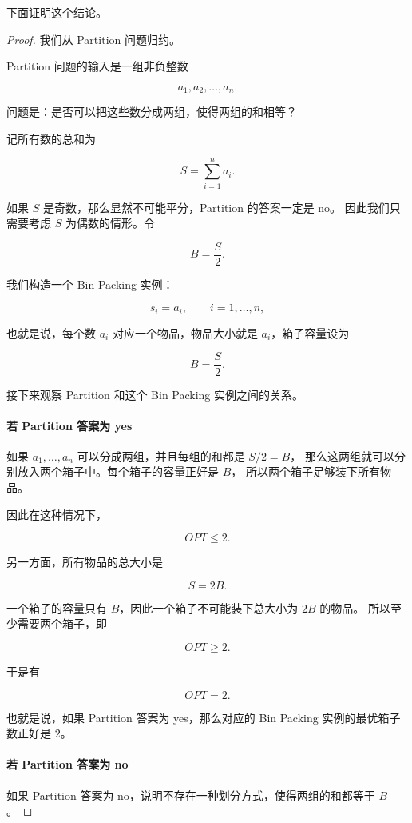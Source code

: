 \documentclass[UTF8,openany,12pt]{ctexbook}
\theoremstyle{remark}
\begin{document}
下面证明这个结论。

\begin{proof}
我们从 Partition 问题归约。

Partition 问题的输入是一组非负整数

$$
a_1,a_2,\dots,a_n.
$$

问题是：是否可以把这些数分成两组，使得两组的和相等？

记所有数的总和为

$$
S=\sum_{i=1}^n a_i.
$$

如果 $S$ 是奇数，那么显然不可能平分，Partition 的答案一定是 no。
因此我们只需要考虑 $S$ 为偶数的情形。令

$$
B=\frac{S}{2}.
$$

我们构造一个 Bin Packing 实例：

$$
s_i = a_i,\qquad i=1,\dots,n,
$$

也就是说，每个数 $a_i$ 对应一个物品，物品大小就是 $a_i$，箱子容量设为

$$
B=\frac{S}{2}.
$$

接下来观察 Partition 和这个 Bin Packing 实例之间的关系。

\paragraph{若 Partition 答案为 yes}

如果 $a_1,\dots,a_n$ 可以分成两组，并且每组的和都是 $S/2=B$，
那么这两组就可以分别放入两个箱子中。每个箱子的容量正好是 $B$，
所以两个箱子足够装下所有物品。

因此在这种情况下，

$$
OPT \le 2.
$$

另一方面，所有物品的总大小是

$$
S = 2B.
$$

一个箱子的容量只有 $B$，因此一个箱子不可能装下总大小为 $2B$ 的物品。
所以至少需要两个箱子，即

$$
OPT \ge 2.
$$

于是有

$$
OPT = 2.
$$

也就是说，如果 Partition 答案为 yes，那么对应的 Bin Packing 实例的最优箱子数正好是 $2$。

\paragraph{若 Partition 答案为 no}

如果 Partition 答案为 no，说明不存在一种划分方式，使得两组的和都等于 $B$。


\end{proof}
\end{document}
